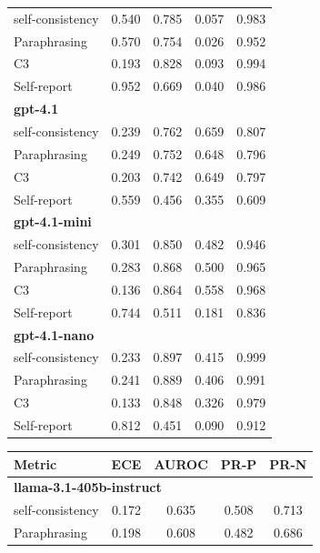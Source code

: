 \documentclass[11pt]{article}
\theoremstyle{plain}
\theoremstyle{definition}
\theoremstyle{remark}
\begin{document}
\begin{table}[p]
\begin{minipage}[t]{0.48\textwidth}
\begin{tabular}{lcccc}
        self-consistency & 0.540 & 0.785 & 0.057 & 0.983 \\
        Paraphrasing     & 0.570 & 0.754 & 0.026 & 0.952 \\
       C3             & 0.193 & 0.828 & 0.093 & 0.994 \\
        Self-report      & 0.952 & 0.669 & 0.040 & 0.986 \\
        \midrule
        \multicolumn{5}{l}{\textbf{gpt-4.1}} \\
        self-consistency & 0.239 & 0.762 & 0.659 & 0.807 \\
        Paraphrasing     & 0.249 & 0.752 & 0.648 & 0.796 \\
       C3             & 0.203 & 0.742 & 0.649 & 0.797 \\
        Self-report      & 0.559 & 0.456 & 0.355 & 0.609 \\
        \midrule
        \multicolumn{5}{l}{\textbf{gpt-4.1-mini}} \\
        self-consistency & 0.301 & 0.850 & 0.482 & 0.946 \\
        Paraphrasing     & 0.283 & 0.868 & 0.500 & 0.965 \\
       C3             & 0.136 & 0.864 & 0.558 & 0.968 \\
        Self-report      & 0.744 & 0.511 & 0.181 & 0.836 \\
        \midrule
        \multicolumn{5}{l}{\textbf{gpt-4.1-nano}} \\
        self-consistency & 0.233 & 0.897 & 0.415 & 0.999 \\
        Paraphrasing     & 0.241 & 0.889 & 0.406 & 0.991 \\
       C3             & 0.133 & 0.848 & 0.326 & 0.979 \\
        Self-report      & 0.812 & 0.451 & 0.090 & 0.912 \\
        \bottomrule
    \end{tabular}
\end{minipage}
\hfill
\begin{minipage}[t]{0.48\textwidth}
    \centering
    \begin{tabular}{lcccc}
        \toprule
        \textbf{Metric} & \textbf{ECE} & \textbf{AUROC} & \textbf{PR-P} & \textbf{PR-N} \\
        \midrule
        \multicolumn{5}{l}{\textbf{llama-3.1-405b-instruct}} \\
        self-consistency & 0.172 & 0.635 & 0.508 & 0.713 \\
        Paraphrasing     & 0.198 & 0.608 & 0.482 & 0.686 \\

\end{tabular}
\end{minipage}
\end{table}
\end{document}
